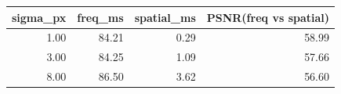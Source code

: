 \begin{tabular}{rrrr}
\toprule
sigma_px & freq_ms & spatial_ms & PSNR(freq vs spatial) \\
\midrule
1.00 & 84.21 & 0.29 & 58.99 \\
3.00 & 84.25 & 1.09 & 57.66 \\
8.00 & 86.50 & 3.62 & 56.60 \\
\bottomrule
\end{tabular}
